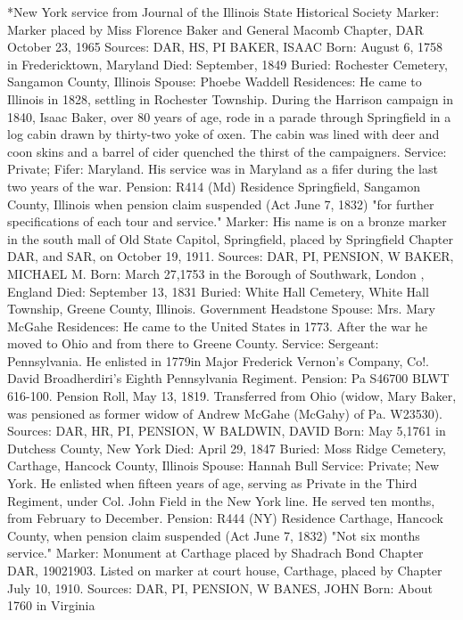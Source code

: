 *New York service from Journal of the Illinois State Historical Society 
Marker: Marker placed by Miss Florence Baker and General Macomb Chapter, DAR October 23, 1965 
Sources: DAR, HS, PI 
BAKER, ISAAC 
Born: August 6, 1758 in Fredericktown, Maryland 
Died: September, 1849 
Buried: Rochester Cemetery, Sangamon County, Illinois 
Spouse: Phoebe Waddell 
Residences: He came to Illinois in 1828, settling in Rochester Township. During the Harrison campaign in 1840, Isaac Baker, over 80 years of age, rode in a parade through Springfield in a log cabin drawn by thirty-two yoke of oxen. The cabin was lined with deer and coon skins and a barrel of cider quenched the thirst of the campaigners. 
Service: Private; Fifer: Maryland. His service was in Maryland as a fifer during the last two years of the war. 
Pension: R414 (Md) Residence Springfield, Sangamon County, Illinois when pen­sion claim suspended (Act June 7, 1832) "for further specifications of each tour and service." 
Marker: His name is on a bronze marker in the south mall of Old State Capitol, Springfield, placed by Springfield Chapter DAR, and SAR, on October 19, 1911. 
Sources: DAR, PI, PENSION, W 
BAKER, MICHAEL M. 
Born: March 27,1753 in the Borough of Southwark, London , England 
Died: September 13, 1831 
Buried: White Hall Cemetery, White Hall Township, Greene County, Illinois. Government Headstone 
Spouse: Mrs. Mary McGahe 
Residences: He came to the United States in 1773. After the war he moved to Ohio and from there to Greene County. 
Service: Sergeant: Pennsylvania. He enlisted in 1779in Major Frederick Vernon's Company, Co!. David Broadherdiri's Eighth Pennsylvania Regiment. 
Pension: Pa S46700 BLWT 616-100. Pension Roll, May 13, 1819. Transferred from Ohio (widow, Mary Baker, was pensioned as former widow of Andrew McGahe (McGahy) of Pa. W23530). 
Sources: DAR, HR, PI, PENSION, W 
BALDWIN, DAVID 
Born: May 5,1761 in Dutchess County, New York Died: April 29, 1847 
Buried: Moss Ridge Cemetery, Carthage, Hancock County, Illinois 
Spouse: Hannah Bull 
Service: Private; New York. He enlisted when fifteen years of age, serving as Private in the Third Regiment, under Col. John Field in the New York line. He served ten months, from February to December. 
Pension: R444 (NY) Residence Carthage, Hancock County, when pension claim suspended (Act June 7, 1832) "Not six months service." 
Marker: Monument at Carthage placed by Shadrach Bond Chapter DAR, 1902­1903. Listed on marker at court house, Carthage, placed by Chapter July 10, 1910. 
Sources: DAR, PI, PENSION, W 
BANES, JOHN 
Born: About 1760 in Virginia 
